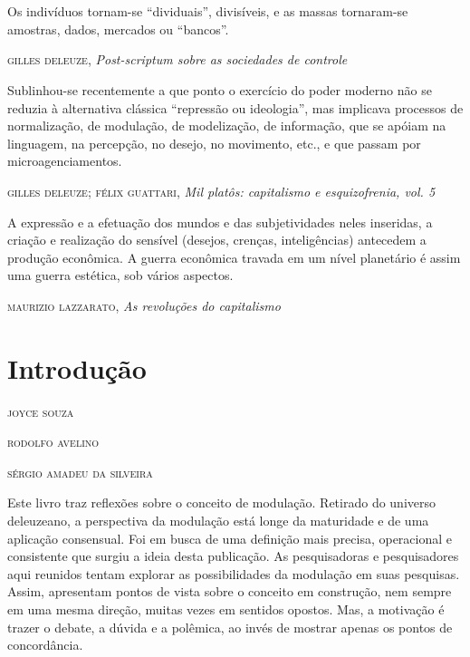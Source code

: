 \chapter*{}

\vspace*{\fill}

\thispagestyle{empty}

\epigraph{Os indivíduos tornam-se ``dividuais'', divisíveis, e as massas
tornaram-se amostras, dados, mercados ou ``bancos''.}{\textsc{gilles deleuze}, \emph{Post-scriptum sobre as sociedades de controle}}

\epigraph{Sublinhou-se recentemente a que ponto o exercício do poder moderno não
se reduzia à alternativa clássica ``repressão ou ideologia'', mas
implicava processos de normalização, de modulação, de modelização, de
informação, que se apóiam na linguagem, na percepção, no desejo, no
movimento, etc., e que passam por microagenciamentos.}{\textsc{gilles deleuze}; \textsc{félix guattari}, \emph{Mil platôs: capitalismo e esquizofrenia, vol. 5}}

\epigraph{A expressão e a efetuação dos mundos e das subjetividades neles
inseridas, a criação e realização do sensível (desejos, crenças,
inteligências) antecedem a produção econômica. A guerra econômica
travada em um nível planetário é assim uma guerra estética, sob vários
aspectos.}{\textsc{maurizio lazzarato}, \emph{As revoluções do capitalismo}}


\chapter*{Introdução}


\begin{flushright}
\textsc{joyce souza}

\textsc{rodolfo avelino}

\textsc{sérgio amadeu da silveira}
\end{flushright}

Este livro traz reflexões sobre o conceito de modulação. Retirado do
universo deleuzeano, a perspectiva da modulação está longe da maturidade
e de uma aplicação consensual. Foi em busca de uma definição mais
precisa, operacional e consistente que surgiu a ideia desta publicação.
As pesquisadoras e pesquisadores aqui reunidos tentam explorar as
possibilidades da modulação em suas pesquisas. Assim, apresentam pontos
de vista sobre o conceito em construção, nem sempre em uma mesma
direção, muitas vezes em sentidos opostos. Mas, a motivação é trazer o
debate, a dúvida e a polêmica, ao invés de mostrar apenas os pontos de
concordância.

